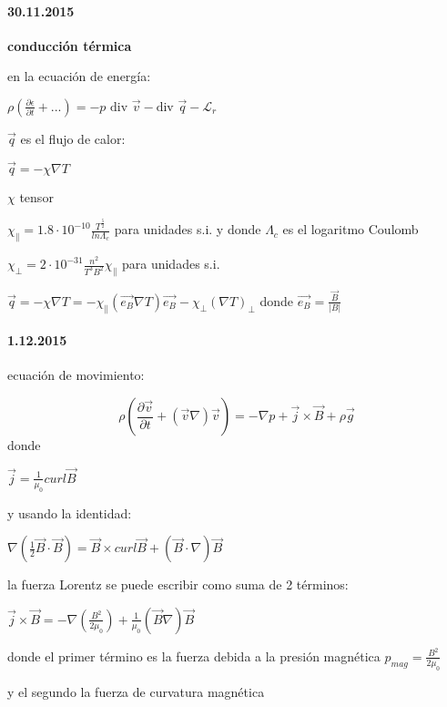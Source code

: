 \documentclass[10pt]{book}
\begin{document}
\paragraph {30.11.2015}


\textbf{conducción térmica}

en la ecuación de energía:

$\rho (\frac{\partial \epsilon}{\partial t} + ...) = -p \text{ div } \vec{v} - \text{div } \vec{q} - \mathcal{L}_r $

$\vec{q}$ es el flujo de calor:

$\vec{q} = - \chi \nabla T$

$\chi$  tensor


$\chi_{\parallel} = 1.8 \cdot 10^{-10} \frac{T^{\frac{5}{2}}}{ln \Lambda_c}$ para unidades s.i. y donde  $\Lambda_c$ es el logaritmo Coulomb
  

$\chi_{\perp} = 2 \cdot 10^{-31} \frac{n^2}{T^3 B^2} \chi_{\parallel}$ para unidades s.i. 


$\vec{q} = - \chi \nabla T = - \chi_{\parallel} (\vec{e_B} \nabla T ) \vec{e_B} - \chi_{\perp} (\nabla T)_{\perp}$ donde
$\vec{e_B} = \frac{\vec{B}}{|B|} $


\paragraph {1.12.2015}


ecuación de movimiento:

\begin{equation}
\rho (\frac{\partial \vec{v}}{\partial t} + (\vec{v}\nabla) \vec{v}) = - \nabla p + \vec{j} \times \vec{B} + \rho \vec{g} 
\end{equation}
donde

$\vec{j} = \frac{1}{\mu_0} curl \vec{B}$ 

y usando la identidad:

$\nabla (\frac{1}{2} \vec{B} \cdot \vec{B}) = \vec{B} \times curl \vec{B} + (\vec{B} \cdot \nabla) \vec{B}  $

la fuerza Lorentz se puede escribir como suma de 2 términos:

$\vec{j} \times \vec{B} = -\nabla (\frac{B^2}{2 \mu_0}) + \frac{1}{\mu_0} (\vec{B}\nabla) \vec{B}$ 

donde el primer término es la fuerza debida a la  presión magnética $p_{mag} = \frac{B^2}{2 \mu_0}$ 

y el segundo la fuerza de curvatura magnética
\end{document}

